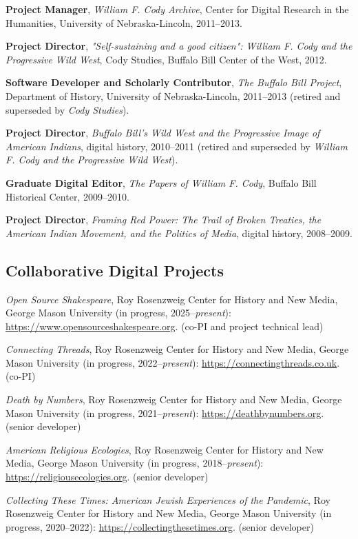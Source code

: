 \documentclass[10pt]{article}
\begin{document}
\textbf{Project Manager}, \textit{William F. Cody Archive}, Center for Digital Research in the Humanities, University of Nebraska-Lincoln, 2011--2013.

\textbf{Project Director}, \textit{"Self-sustaining and a good citizen": William F. Cody and the Progressive Wild West}, Cody Studies, Buffalo Bill Center of the West, 2012.

\textbf{Software Developer and Scholarly Contributor}, \textit{The Buffalo Bill Project}, Department of History, University of Nebraska-Lincoln, 2011--2013 (retired and superseded by \textit{Cody Studies}).

\textbf{Project Director}, \textit{Buffalo Bill's Wild West and the Progressive Image of American Indians}, digital history, 2010--2011 (retired and superseded by \textit{William F. Cody and the Progressive Wild West}).

\textbf{Graduate Digital Editor}, \textit{The Papers of William F. Cody}, Buffalo Bill Historical Center, 2009--2010.

\textbf{Project Director}, \textit{Framing Red Power: The Trail of Broken Treaties, the American Indian Movement, and the Politics of Media}, digital history, 2008--2009.

\subsection{Collaborative Digital Projects}

\textit{Open Source Shakespeare}, Roy Rosenzweig Center for History and New Media, George Mason University (in progress, 2025--\textit{present}): \url{https://www.opensourceshakespeare.org}. (co-PI and project technical lead)

\textit{Connecting Threads}, Roy Rosenzweig Center for History and New Media, George Mason University (in progress, 2022--\textit{present}): \url{https://connectingthreads.co.uk}. (co-PI)

\textit{Death by Numbers}, Roy Rosenzweig Center for History and New Media, George Mason University (in progress, 2021--\textit{present}): \url{https://deathbynumbers.org}. (senior developer)

\textit{American Religious Ecologies}, Roy Rosenzweig Center for History and New Media, George Mason University (in progress, 2018--\textit{present}): \url{https://religiousecologies.org}. (senior developer)

\textit{Collecting These Times: American Jewish Experiences of the Pandemic}, Roy Rosenzweig Center for History and New Media, George Mason University (in progress, 2020--2022): \url{https://collectingthesetimes.org}. (senior developer)
\end{document}

